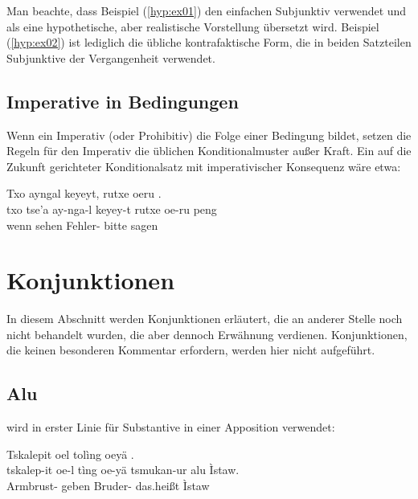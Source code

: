 \noindent Man beachte, dass Beispiel (\ref{hyp:ex01}) den einfachen Subjunktiv verwendet und als eine hypothetische, aber realistische Vorstellung übersetzt wird. Beispiel (\ref{hyp:ex02}) ist lediglich die übliche kontrafaktische Form, die in beiden Satzteilen Subjunktive der Vergangenheit verwendet.

\subsection{Imperative in Bedingungen} Wenn ein Imperativ (oder Prohibitiv) die Folge einer Bedingung bildet, setzen die Regeln für den Imperativ die üblichen Konditionalmuster außer Kraft. Ein auf die Zukunft gerichteter Konditionalsatz mit imperativischer Konsequenz wäre etwa:

\begin{interlin}
	\glll \Npawl{}Txo  ayngal keyeyt, rutxe oeru . \\
	txo tse'a ay-nga-l keyey-t rutxe oe-ru peng \\
	wenn sehen  Fehler- bitte  sagen \\
\end{interlin}

\section{Konjunktionen}
\noindent In diesem Abschnitt werden Konjunktionen erläutert, die an anderer Stelle noch nicht behandelt wurden, die aber dennoch Erwähnung verdienen. Konjunktionen, die keinen besonderen Kommentar erfordern, werden hier nicht aufgeführt.

\subsection{Alu}  wird in erster Linie für Substantive in einer Apposition verwendet:

\begin{interlin}
	\glll \Npawl{}Tskalepit oel tolìng oeyä   . \\
	tskalep-it oe-l tìng oe-yä tsmukan-ur  alu Ìstaw. \\
	Armbrust-  geben  Bruder- das.heißt Ìstaw \\
\end{interlin}

